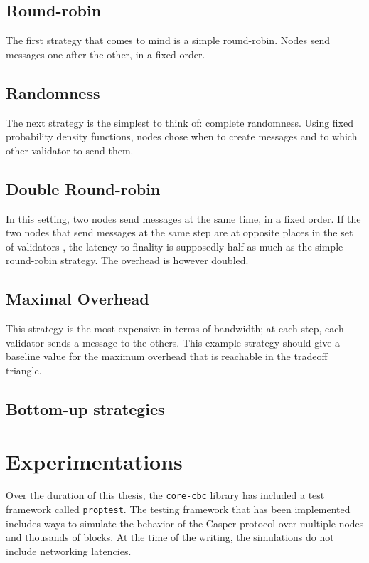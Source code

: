 \subsection{Round-robin}
The first strategy that comes to mind is a simple round-robin. Nodes send
messages one after the other, in a fixed order.

\subsection{Randomness}
The next strategy is the simplest to think of: complete randomness. Using fixed
probability density functions, nodes chose when to create messages and to which
other validator to send them.

\subsection{Double Round-robin}
In this setting, two nodes send messages at the same time, in a fixed order. If
the two nodes that send messages at the same step are at opposite places in the
set of validators , the latency to finality is supposedly
half as much as the simple round-robin strategy. The overhead is however
doubled.

\subsection{Maximal Overhead}
This strategy is the most expensive in terms of bandwidth; at each step, each
validator sends a message to the others. This example strategy should give a
baseline value for the maximum overhead that is reachable in the tradeoff
triangle.

\subsection{Bottom-up strategies}

\section{Experimentations}
Over the duration of this thesis, the \texttt{core-cbc} library has included a
test framework called \texttt{proptest}. The testing framework that has been
implemented includes ways to simulate the behavior of the Casper protocol over
multiple nodes and thousands  of blocks. At the time of the
writing, the simulations do not include networking latencies.

